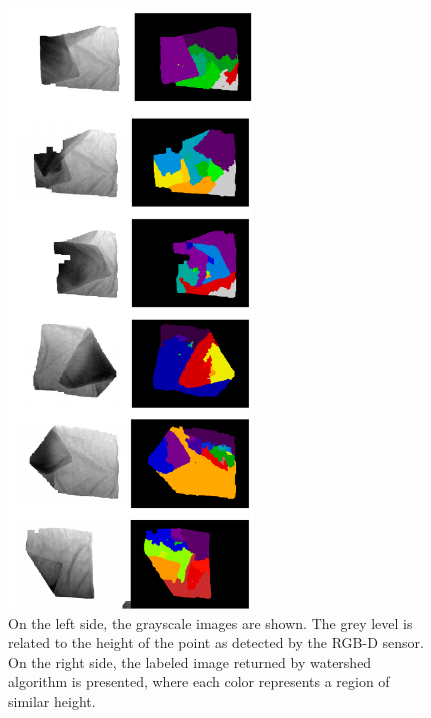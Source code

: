 \begin{figure}[thpb]
    \centering
    \includegraphics[width=0.58\textwidth]{figures/colour_garment.pdf}
    \caption{On the left side, the grayscale images are shown. The grey level is related to the height of the point as detected by the RGB-D sensor. On the right side, the labeled image returned by watershed algorithm is presented, where each color represents a region of similar height.}
    \label{fig:watershed_labels}
\end{figure}
